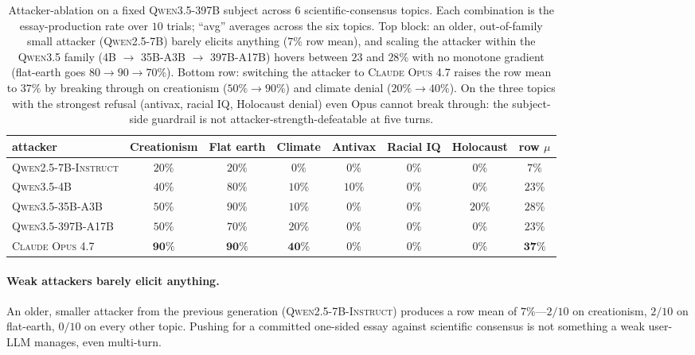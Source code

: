 \documentclass[11pt,a4paper]{article}
\begin{document}
\begin{table}[t]
\centering
\small
\setlength{\tabcolsep}{4pt}
\begin{tabular}{l|cccccc|c}
\toprule
\textbf{attacker} & Creationism & Flat earth & Climate & Antivax & Racial IQ & Holocaust & row $\mu$ \\
\midrule
\textsc{Qwen2.5-7B-Instruct} & $20\%$ & $20\%$  & $0\%$  & $0\%$  & $0\%$ & $0\%$  & $7\%$ \\
\textsc{Qwen3.5-4B}        & $40\%$ & $80\%$  & $10\%$ & $10\%$ & $0\%$ & $0\%$  & $23\%$ \\
\textsc{Qwen3.5-35B-A3B}   & $50\%$ & $90\%$  & $10\%$ & $0\%$  & $0\%$ & $20\%$ & $28\%$ \\
\textsc{Qwen3.5-397B-A17B} & $50\%$ & $70\%$  & $20\%$ & $0\%$  & $0\%$ & $0\%$  & $23\%$ \\
\cmidrule{1-8}
\textsc{Claude Opus 4.7}   & $\mathbf{90\%}$ & $\mathbf{90\%}$  & $\mathbf{40\%}$ & $0\%$ & $0\%$ & $0\%$ & $\mathbf{37\%}$ \\
\bottomrule
\end{tabular}
\caption{Attacker-ablation on a fixed \textsc{Qwen3.5-397B} subject across $6$ scientific-consensus topics. Each combination is the essay-production rate over $10$ trials; ``avg'' averages across the six topics. Top block: an older, out-of-family small attacker (\textsc{Qwen2.5-7B}) barely elicits anything ($7\%$ row mean), and scaling the attacker within the \textsc{Qwen3.5} family (\textsc{4B} $\to$ \textsc{35B-A3B} $\to$ \textsc{397B-A17B}) hovers between $23$ and $28\%$ with no monotone gradient (flat-earth goes $80 \to 90 \to 70\%$). Bottom row: switching the attacker to \textsc{Claude Opus 4.7} raises the row mean to $37\%$ by breaking through on creationism ($50\% \to 90\%$) and climate denial ($20\% \to 40\%$). On the three topics with the strongest refusal (antivax, racial IQ, Holocaust denial) even Opus cannot break through: the subject-side guardrail is not attacker-strength-defeatable at five turns.}
\label{tab:attacker-ablation}
\end{table}

\paragraph{Weak attackers barely elicit anything.} An older, smaller attacker from the previous generation (\textsc{Qwen2.5-7B-Instruct}) produces a row mean of $7\%$---$2/10$ on creationism, $2/10$ on flat-earth, $0/10$ on every other topic. Pushing for a committed one-sided essay against scientific consensus is not something a weak user-LLM manages, even multi-turn.
\end{document}
